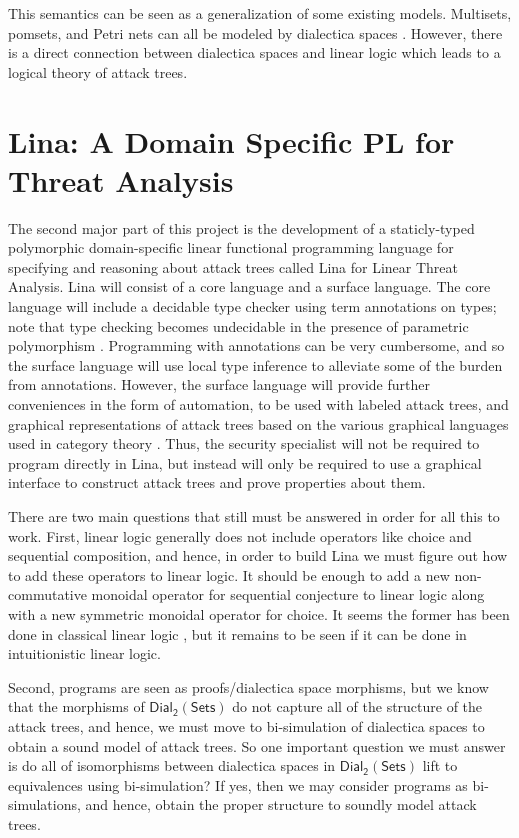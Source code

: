 \documentclass{llncs}
\newcommand{\dial}[0]{\mathsf{Dial_2}(\mathsf{Sets})}
\begin{document}
This semantics can be seen as a generalization of some existing
models.  Multisets, pomsets, and Petri nets can all be modeled by
dialectica spaces \cite{Brown:1991,Gupta:1994}.  However, there is a
direct connection between dialectica spaces and linear logic which
leads to a logical theory of attack trees.

\section{Lina: A Domain Specific PL for Threat Analysis}
\label{sec:lina:_a_domain_specific_pl_for_threat_analysis}

The second major part of this project is the development of a
staticly-typed polymorphic domain-specific linear functional
programming language for specifying and reasoning about attack trees
called Lina for Linear Threat Analysis.  Lina will consist of a core
language and a surface language.  The core language will include a
decidable type checker using term annotations on types; note that type
checking becomes undecidable in the presence of parametric
polymorphism \cite{Wells:1999}.  Programming with annotations can be
very cumbersome, and so the surface language will use local type
inference \cite{Pierce:2000} to alleviate some of the burden from
annotations.  However, the surface language will provide further
conveniences in the form of automation, to be used with labeled attack
trees, and graphical representations of attack trees based on the
various graphical languages used in category theory
\cite{Selinger:2009}.  Thus, the security specialist will not be
required to program directly in Lina, but instead will only be
required to use a graphical interface to construct attack trees and
prove properties about them.

There are two main questions that still must be answered in order for
all this to work.  First, linear logic generally does not include
operators like choice and sequential composition, and hence, in order
to build Lina we must figure out how to add these operators to linear
logic.  It should be enough to add a new non-commutative monoidal
operator for sequential conjecture to linear logic along with a new
symmetric monoidal operator for choice.  It seems the former has been
done in classical linear logic \cite{Retore:1997}, but it remains to
be seen if it can be done in intuitionistic linear logic.

Second, programs are seen as proofs/dialectica space morphisms, but we
know that the morphisms of $\dial$ do not capture all of the structure
of the attack trees, and hence, we must move to bi-simulation of
dialectica spaces to obtain a sound model of attack trees.  So one
important question we must answer is do all of isomorphisms between
dialectica spaces in $\dial$ lift to equivalences using bi-simulation?
If yes, then we may consider programs as bi-simulations, and hence,
obtain the proper structure to soundly model attack trees.
\end{document}
